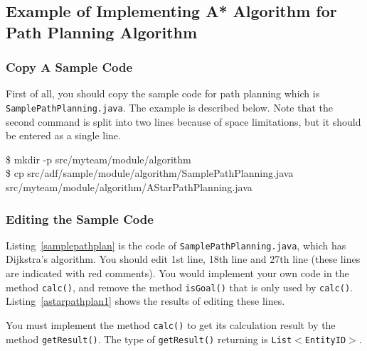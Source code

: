 \documentclass[a4paper]{article}
\begin{document}
\subsection{Example of Implementing A* Algorithm for Path Planning Algorithm}
\subsubsection{Copy A Sample Code}
First of all, you should copy the sample code for path planning which is \texttt{SamplePathPlanning.java}. The example is described below. Note that the second command is split into two lines because of space limitations, but it should be entered as a single line.
\begin{center}
   \begin{tcolorbox}[title=Copy the Sample Path Planning, width=.98\linewidth]
    {\ttfamily
    \$ mkdir -p src/myteam/module/algorithm\\
    \$ cp src/adf/sample/module/algorithm/SamplePathPlanning.java src/myteam/module/algorithm/AStarPathPlanning.java
    }
  \end{tcolorbox}
\end{center}
\subsubsection{Editing the Sample Code}
Listing~\ref{samplepathplan} is the code of \texttt{SamplePathPlanning.java},
which has Dijkstra's algorithm. You should edit 1st line, 18th line and 27th line (these lines are indicated with red comments). You would implement your own code in the method \texttt{calc()}, and remove the method \texttt{isGoal()} that is only used by \texttt{calc()}. Listing~\ref{astarpathplan1} shows the results of editing these lines.

You must implement the method \texttt{calc()} to get its calculation result
by the method \texttt{getResult()}. The type of \texttt{getResult()} returning is \texttt{List$<$EntityID$>$}.
\end{document}
